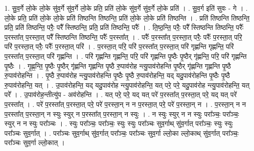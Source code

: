 \documentclass[17pt]{extarticle}
\begin{document}
1. सु॒व॒र्गे लो॒के लो॒के सु॑व॒र्गे सु॑व॒र्गे लो॒के प्रति॒ प्रति॑ लो॒के सु॑व॒र्गे सु॑व॒र्गे लो॒के प्रति॑ । . सु॒व॒र्ग इति॑ सुवः - गे । . लो॒के प्रति॒ प्रति॑ लो॒के लो॒के प्रति॑ तिष्ठन्ति तिष्ठन्ति॒ प्रति॑ लो॒के लो॒के प्रति॑ तिष्ठन्ति । . प्रति॑ तिष्ठन्ति तिष्ठन्ति॒ प्रति॒ प्रति॑ तिष्ठन्ति॒ परैः॒ परै᳚ स्तिष्ठन्ति॒ प्रति॒ प्रति॑ तिष्ठन्ति॒ परैः᳚ । . ति॒ष्ठ॒न्ति॒ परैः॒ परै᳚ स्तिष्ठन्ति तिष्ठन्ति॒ परैः᳚ प॒रस्ता᳚त् प॒रस्ता॒त् परै᳚ स्तिष्ठन्ति तिष्ठन्ति॒ परैः᳚ प॒रस्ता᳚त् । . परैः᳚ प॒रस्ता᳚त् प॒रस्ता॒त् परैः॒ परैः᳚ प॒रस्ता॒त् परि॒ परि॑ प॒रस्ता॒त् परैः॒ परैः᳚ प॒रस्ता॒त् परि॑ । . प॒रस्ता॒त् परि॒ परि॑ प॒रस्ता᳚त् प॒रस्ता॒त् परि॑ गृह्णन्ति गृह्णन्ति॒ परि॑ प॒रस्ता᳚त् प॒रस्ता॒त् परि॑ गृह्णन्ति । . परि॑ गृह्णन्ति गृह्णन्ति॒ परि॒ परि॑ गृह्णन्ति पृ॒ष्ठैः पृ॒ष्ठैर् गृ॑ह्णन्ति॒ परि॒ परि॑ गृह्णन्ति पृ॒ष्ठैः । . गृ॒ह्ण॒न्ति॒ पृ॒ष्ठैः पृ॒ष्ठैर् गृ॑ह्णन्ति गृह्णन्ति पृ॒ष्ठै रु॒पाव॑रोह न्त्यु॒पाव॑रोहन्ति पृ॒ष्ठैर् गृ॑ह्णन्ति गृह्णन्ति पृ॒ष्ठै रु॒पाव॑रोहन्ति । . पृ॒ष्ठै रु॒पाव॑रोह न्त्यु॒पाव॑रोहन्ति पृ॒ष्ठैः पृ॒ष्ठै रु॒पाव॑रोहन्ति॒ यद् यदु॒पाव॑रोहन्ति पृ॒ष्ठैः पृ॒ष्ठै रु॒पाव॑रोहन्ति॒ यत् । . उ॒पाव॑रोहन्ति॒ यद् यदु॒पाव॑रोह न्त्यु॒पाव॑रोहन्ति॒ यत् परे॒ परे॒ यदु॒पाव॑रोह न्त्यु॒पाव॑रोहन्ति॒ यत् परे᳚ । . उ॒पाव॑रोह॒न्तीत्यु॑प - अव॑रोहन्ति । . यत् परे॒ परे॒ यद् यत् परे॑ प॒रस्ता᳚त् प॒रस्ता॒त् परे॒ यद् यत् परे॑ प॒रस्ता᳚त् । . परे॑ प॒रस्ता᳚त् प॒रस्ता॒त् परे॒ परे॑ प॒रस्ता॒न् न न प॒रस्ता॒त् परे॒ परे॑ प॒रस्ता॒न् न । . प॒रस्ता॒न् न न प॒रस्ता᳚त् प॒रस्ता॒न् न स्युः स्युर् न प॒रस्ता᳚त् प॒रस्ता॒न् न स्युः । . न स्युः स्युर् न न स्युः परा᳚ञ्चः॒ परा᳚ञ्चः॒ स्युर् न न स्युः परा᳚ञ्चः । . स्युः परा᳚ञ्चः॒ परा᳚ञ्चः॒ स्युः स्युः परा᳚ञ्चः सुव॒र्गाथ् सु॑व॒र्गात् परा᳚ञ्चः॒ स्युः स्युः परा᳚ञ्चः सुव॒र्गात् । . परा᳚ञ्चः सुव॒र्गाथ् सु॑व॒र्गात् परा᳚ञ्चः॒ परा᳚ञ्चः सुव॒र्गा ल्लो॒का ल्लो॒काथ् सु॑व॒र्गात् परा᳚ञ्चः॒ परा᳚ञ्चः सुव॒र्गा ल्लो॒कात् । \newline
\end{document}
